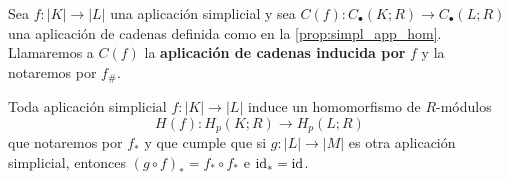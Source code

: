 \begin{definicion}
	\label{def:chain-map-ind} Sea \(f : |K| \to |L|\) una aplicación simplicial y sea
	\(C(f): C_{\bullet}(K;R) \to C_{\bullet}(L;R)\) una aplicación de cadenas definida
	como en la \autoref{prop:simpl_app_hom}. Llamaremos a \(C(f)\) la \textbf{aplicación
	de cadenas inducida por} \(f\) y la notaremos por \(f_{\#}\).
\end{definicion}

\begin{corolario}
	Toda aplicación simplicial \(f: |K| \to |L|\) induce un homomorfismo de \(R\)-módulos
	\[
		H(f) : H_{p}(K;R) \to H_{p}(L;R)
	\]
	que notaremos por \(f_{*}\) y que cumple que si \(g: |L| \to |M|\) es otra aplicación
	simplicial, entonces \((g \circ f)_{*}=f_{*} \circ f_{*}\) e \(\operatorname{id}_{*} = \operatorname{id}\).
\end{corolario}

